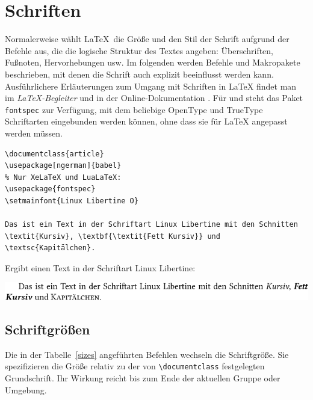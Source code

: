 

\section{Schriften}
Normalerweise wählt \LaTeX\ die Größe und den Stil der Schrift
aufgrund der Befehle aus, die die logische Struktur des Textes angeben:
Überschriften, Fußnoten, Hervorhebungen usw.
Im folgenden werden Befehle und Makropakete beschrieben, mit denen
die Schrift auch explizit beeinflusst werden kann.
Ausführlichere Erläuterungen zum Umgang mit Schriften in \LaTeX{}
findet man im \textit{\LaTeX-Begleiter} \cite{wonne}
und in der Online-Dokumentation \cite{fntguide}. Für \XeLaTeX{} und \LuaLaTeX{} steht das Paket
\texttt{fontspec} zur Verfügung, mit dem beliebige OpenType und TrueType Schriftarten eingebunden werden können, ohne dass sie für \LaTeX{} angepasst werden müssen. 

\begin{lstlisting}
\documentclass{article}
\usepackage[ngerman]{babel}
% Nur XeLaTeX und LuaLaTeX:
\usepackage{fontspec}
\setmainfont{Linux Libertine O}

Das ist ein Text in der Schriftart Linux Libertine mit den Schnitten
\textit{Kursiv}, \textbf{\textit{Fett Kursiv}} und \textsc{Kapitälchen}.

\end{lstlisting}

Ergibt einen Text in der Schriftart Linux Libertine:

\medskip

\noindent\includegraphics{fontspec}

\subsection{Schriftgrößen}
 
Die in der Tabelle~\ref{sizes} angeführten Befehlen 
wechseln die Schriftgröße.
Sie spezifizieren die Größe relativ
zu der von \lstinline:\documentclass: festgelegten Grundschrift.
Ihr Wirkung reicht bis zum Ende der aktuellen Gruppe oder Umgebung.


